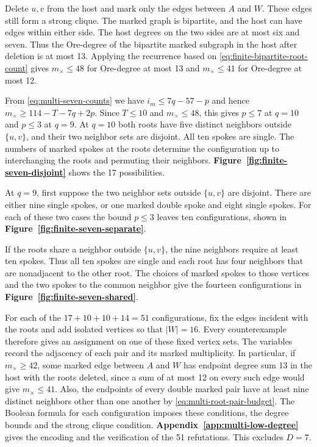 Delete $u,v$ from the host and mark only the edges between
$A$ and $W$. These edges still form a strong clique. The
marked graph is bipartite, and the host can have edges within
either side. The host degrees on the two sides are at most
six and seven. Thus the Ore-degree of the bipartite marked
subgraph in the host after deletion is at most 13.
Applying the recurrence based on \eqref{eq:finite-bipartite-root-count}
gives $m_\times\le48$ for Ore-degree at most 13 and
$m_\times\le41$ for Ore-degree at most 12.

From \eqref{eq:multi-seven-counts} we have $i_m\leq7q-57-p$ and hence
$m_\times\geq114-T-7q+2p$. Since $T\leq10$ and $m_\times\leq48$, this
gives $p\le7$ at $q=10$ and $p\le3$ at $q=9$. At $q=10$ both roots
have five distinct neighbors outside $\{u,v\}$, and their two neighbor
sets are disjoint. All ten spokes are single. The numbers of marked
spokes at the roots determine the configuration up to interchanging
the roots and permuting their neighbors.
\textbf{Figure~\ref{fig:finite-seven-disjoint}} shows the 17 possibilities.



At $q=9$, first suppose the two neighbor sets outside $\{u,v\}$ are
disjoint. There are either nine single spokes, or one marked double
spoke and eight single spokes. For each of these two cases the
bound $p\leq3$ leaves ten configurations, shown in
\textbf{Figure~\ref{fig:finite-seven-separate}}.



If the roots share a neighbor outside $\{u,v\}$, the nine neighbors
require at least ten spokes. Thus all ten spokes are single and each
root has four neighbors that are nonadjacent to the other root.
The choices of marked spokes to those vertices and the
two spokes to the common neighbor give the fourteen configurations in
\textbf{Figure~\ref{fig:finite-seven-shared}}.


\FloatBarrier

For each of the $17+10+10+14=51$ configurations, fix the
edges incident with the roots and add isolated vertices so that $|W|=16$.
Every counterexample therefore gives an assignment on one of these
fixed vertex sets. The variables record the adjacency of each pair
and its marked multiplicity. In particular, if $m_\times\geq42$,
some marked edge between $A$ and $W$ has endpoint degree sum 13
in the host with the roots deleted, since a sum of at most 12 on
every such edge would give $m_\times\leq41$. Also, the endpoints
of every double marked pair have at least nine distinct neighbors
other than one another by \eqref{eq:multi-root-pair-budget}.
The Boolean formula for each configuration imposes these conditions,
the degree bounds and the strong clique condition.
\textbf{Appendix~\ref{app:multi-low-degree}} gives the encoding and
the verification of the 51 refutations. This excludes $D=7$.
